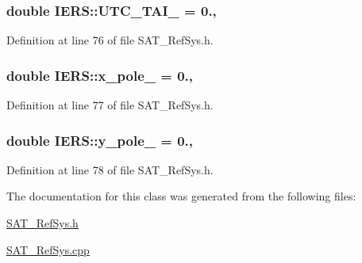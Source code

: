 \hypertarget{classIERS_a4df9d5b7347defccc192c1ab5c437e35}{
\subsubsection[{U\-T\-C\-\_\-\-T\-A\-I\-\_\-}]{\setlength{\rightskip}{0pt plus 5cm}double I\-E\-R\-S\-::\-U\-T\-C\-\_\-\-T\-A\-I\-\_\- = 0.\hspace{0.3cm}{\ttfamily [static]}, {\ttfamily [private]}}}\label{classIERS_a4df9d5b7347defccc192c1ab5c437e35}


Definition at line 76 of file S\-A\-T\-\_\-\-Ref\-Sys.\-h.

\hypertarget{classIERS_ac8c79654837cc32556a29a6d9597f3e8}{
\subsubsection[{x\-\_\-pole\-\_\-}]{\setlength{\rightskip}{0pt plus 5cm}double I\-E\-R\-S\-::x\-\_\-pole\-\_\- = 0.\hspace{0.3cm}{\ttfamily [static]}, {\ttfamily [private]}}}\label{classIERS_ac8c79654837cc32556a29a6d9597f3e8}


Definition at line 77 of file S\-A\-T\-\_\-\-Ref\-Sys.\-h.

\hypertarget{classIERS_a359e82751a2edfbc9d8fe6fa7a9d8061}{
\subsubsection[{y\-\_\-pole\-\_\-}]{\setlength{\rightskip}{0pt plus 5cm}double I\-E\-R\-S\-::y\-\_\-pole\-\_\- = 0.\hspace{0.3cm}{\ttfamily [static]}, {\ttfamily [private]}}}\label{classIERS_a359e82751a2edfbc9d8fe6fa7a9d8061}


Definition at line 78 of file S\-A\-T\-\_\-\-Ref\-Sys.\-h.



The documentation for this class was generated from the following files\-:\begin{DoxyCompactItemize}
\item 
\hyperlink{SAT__RefSys_8h}{S\-A\-T\-\_\-\-Ref\-Sys.\-h}\item 
\hyperlink{SAT__RefSys_8cpp}{S\-A\-T\-\_\-\-Ref\-Sys.\-cpp}\end{DoxyCompactItemize}
